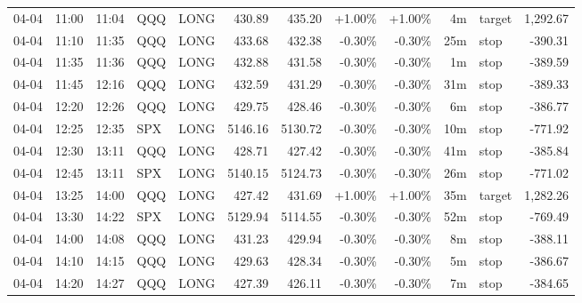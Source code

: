 \documentclass[11pt,a4paper]{article}
\begin{document}
\begin{center}
\begin{longtable}{>{\color{txtmain}}l l l l l r r r r r >{\color{txtmain}}l r}
04-04 & 11:00 & 11:04 & QQQ & LONG & 430.89 & 435.20 & \textcolor{wingreen}{+1.00\%} & \textcolor{wingreen}{+1.00\%} & 4m & target & \textcolor{wingreen}{1,292.67} \\
04-04 & 11:10 & 11:35 & QQQ & LONG & 433.68 & 432.38 & \textcolor{lossred}{-0.30\%} & \textcolor{lossred}{-0.30\%} & 25m & stop & \textcolor{lossred}{-390.31} \\
04-04 & 11:35 & 11:36 & QQQ & LONG & 432.88 & 431.58 & \textcolor{lossred}{-0.30\%} & \textcolor{lossred}{-0.30\%} & 1m & stop & \textcolor{lossred}{-389.59} \\
04-04 & 11:45 & 12:16 & QQQ & LONG & 432.59 & 431.29 & \textcolor{lossred}{-0.30\%} & \textcolor{lossred}{-0.30\%} & 31m & stop & \textcolor{lossred}{-389.33} \\
04-04 & 12:20 & 12:26 & QQQ & LONG & 429.75 & 428.46 & \textcolor{lossred}{-0.30\%} & \textcolor{lossred}{-0.30\%} & 6m & stop & \textcolor{lossred}{-386.77} \\
04-04 & 12:25 & 12:35 & SPX & LONG & 5146.16 & 5130.72 & \textcolor{lossred}{-0.30\%} & \textcolor{lossred}{-0.30\%} & 10m & stop & \textcolor{lossred}{-771.92} \\
04-04 & 12:30 & 13:11 & QQQ & LONG & 428.71 & 427.42 & \textcolor{lossred}{-0.30\%} & \textcolor{lossred}{-0.30\%} & 41m & stop & \textcolor{lossred}{-385.84} \\
04-04 & 12:45 & 13:11 & SPX & LONG & 5140.15 & 5124.73 & \textcolor{lossred}{-0.30\%} & \textcolor{lossred}{-0.30\%} & 26m & stop & \textcolor{lossred}{-771.02} \\
04-04 & 13:25 & 14:00 & QQQ & LONG & 427.42 & 431.69 & \textcolor{wingreen}{+1.00\%} & \textcolor{wingreen}{+1.00\%} & 35m & target & \textcolor{wingreen}{1,282.26} \\
04-04 & 13:30 & 14:22 & SPX & LONG & 5129.94 & 5114.55 & \textcolor{lossred}{-0.30\%} & \textcolor{lossred}{-0.30\%} & 52m & stop & \textcolor{lossred}{-769.49} \\
04-04 & 14:00 & 14:08 & QQQ & LONG & 431.23 & 429.94 & \textcolor{lossred}{-0.30\%} & \textcolor{lossred}{-0.30\%} & 8m & stop & \textcolor{lossred}{-388.11} \\
04-04 & 14:10 & 14:15 & QQQ & LONG & 429.63 & 428.34 & \textcolor{lossred}{-0.30\%} & \textcolor{lossred}{-0.30\%} & 5m & stop & \textcolor{lossred}{-386.67} \\
04-04 & 14:20 & 14:27 & QQQ & LONG & 427.39 & 426.11 & \textcolor{lossred}{-0.30\%} & \textcolor{lossred}{-0.30\%} & 7m & stop & \textcolor{lossred}{-384.65} \\

\end{longtable}
\end{center}
\end{document}
